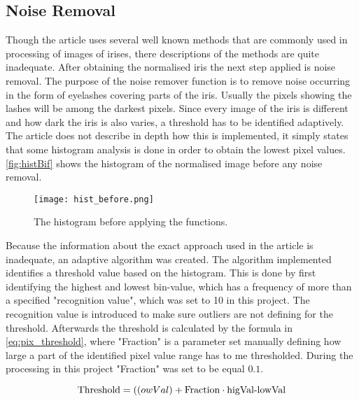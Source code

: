 \subsection{Noise Removal}
Though the article uses several well known methods that are commonly used in processing of images of irises, there descriptions of the methods are quite inadequate. After obtaining the normalised iris the next step applied is noise removal. The purpose of the noise remover function is to remove noise occurring in the form of eyelashes covering parts of the iris. Usually the pixels showing the lashes will be among the darkest pixels. Since every image of the iris is different and how dark the iris is also varies, a threshold has to be identified adaptively. The article does not describe in depth how this is implemented, it simply states that some histogram analysis is done in order to obtain the lowest pixel values. \autoref{fig:histBif} shows the histogram of the normalised image before any noise removal. 
\begin{figure}[h]
\centering
\texttt{[image: hist\_before.png]}
\caption{The histogram before applying the functions.}
\label{fig:histBif}
\end{figure}
Because the information about the exact approach used in the article is inadequate, an adaptive algorithm was created. The algorithm implemented identifies a threshold value based on the histogram. This is done by first identifying the highest and lowest bin-value, which has a frequency of more than a specified "recognition value", which was set to 10 in this project. The recognition value is introduced to make sure outliers are not defining for the threshold. Afterwards the threshold is calculated by the formula in \autoref{eq:pix_threshold}, where "Fraction" is a parameter set manually defining how large a part of the identified pixel value range has to me thresholded. During the processing in this project "Fraction" was set to be equal $0.1$. 

\begin{equation}\label{eq:pix_threshold}
	\text{Threshold}=(\text({owVal})+\text{Fraction}\cdot\text{higVal-lowVal}
\end{equation}


